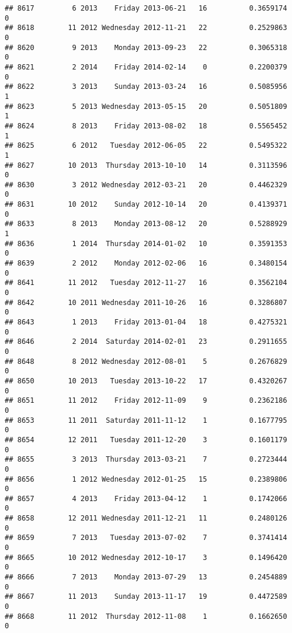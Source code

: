 \documentclass[
]{article}
\begin{document}
\begin{verbatim}
## 8617         6 2013    Friday 2013-06-21   16          0.3659174             0
## 8618        11 2012 Wednesday 2012-11-21   22          0.2529863             0
## 8620         9 2013    Monday 2013-09-23   22          0.3065318             0
## 8621         2 2014    Friday 2014-02-14    0          0.2200379             0
## 8622         3 2013    Sunday 2013-03-24   16          0.5085956             1
## 8623         5 2013 Wednesday 2013-05-15   20          0.5051809             1
## 8624         8 2013    Friday 2013-08-02   18          0.5565452             1
## 8625         6 2012   Tuesday 2012-06-05   22          0.5495322             1
## 8627        10 2013  Thursday 2013-10-10   14          0.3113596             0
## 8630         3 2012 Wednesday 2012-03-21   20          0.4462329             0
## 8631        10 2012    Sunday 2012-10-14   20          0.4139371             0
## 8633         8 2013    Monday 2013-08-12   20          0.5288929             1
## 8636         1 2014  Thursday 2014-01-02   10          0.3591353             0
## 8639         2 2012    Monday 2012-02-06   16          0.3480154             0
## 8641        11 2012   Tuesday 2012-11-27   16          0.3562104             0
## 8642        10 2011 Wednesday 2011-10-26   16          0.3286807             0
## 8643         1 2013    Friday 2013-01-04   18          0.4275321             0
## 8646         2 2014  Saturday 2014-02-01   23          0.2911655             0
## 8648         8 2012 Wednesday 2012-08-01    5          0.2676829             0
## 8650        10 2013   Tuesday 2013-10-22   17          0.4320267             0
## 8651        11 2012    Friday 2012-11-09    9          0.2362186             0
## 8653        11 2011  Saturday 2011-11-12    1          0.1677795             0
## 8654        12 2011   Tuesday 2011-12-20    3          0.1601179             0
## 8655         3 2013  Thursday 2013-03-21    7          0.2723444             0
## 8656         1 2012 Wednesday 2012-01-25   15          0.2389806             0
## 8657         4 2013    Friday 2013-04-12    1          0.1742066             0
## 8658        12 2011 Wednesday 2011-12-21   11          0.2480126             0
## 8659         7 2013   Tuesday 2013-07-02    7          0.3741414             0
## 8665        10 2012 Wednesday 2012-10-17    3          0.1496420             0
## 8666         7 2013    Monday 2013-07-29   13          0.2454889             0
## 8667        11 2013    Sunday 2013-11-17   19          0.4472589             0
## 8668        11 2012  Thursday 2012-11-08    1          0.1662650             0

\end{verbatim}
\end{document}
